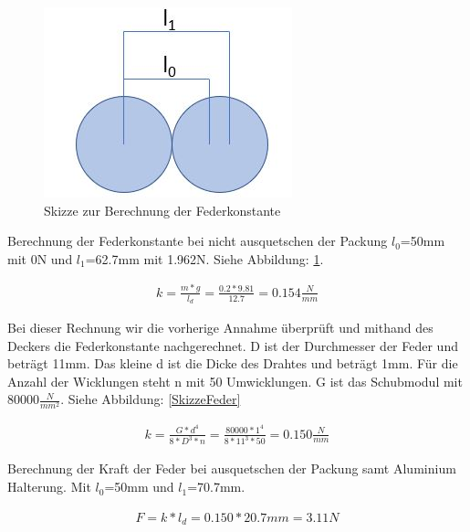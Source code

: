 \begin{figure}[H]
\begin{minipage}[hbt]{.4\linewidth}
      \includegraphics[width=\linewidth]{Bilder/Powerpoint/Federkonstante}
      \caption{Skizze zur Berechnung der Federkonstante}
      \label{SkizzeFederkonstante}
   \end{minipage}
\end{figure}

Berechnung der Federkonstante bei nicht ausquetschen der Packung $l_0$=50mm mit 0N und $l_1$=62.7mm mit 1.962N. Siehe Abbildung: \ref{SkizzeFederkonstante}.

\begin{align*}
k =\frac{m*g}{l_d} = \frac{0.2*9.81}{12.7} = 0.154\frac{N}{mm}
\end{align*}

Bei dieser Rechnung wir die vorherige Annahme überprüft und mithand des Deckers die Federkonstante nachgerechnet. D ist der Durchmesser der Feder und beträgt 11mm. Das kleine d ist die Dicke des Drahtes und beträgt 1mm. Für die Anzahl der Wicklungen steht n mit 50 Umwicklungen. G ist das Schubmodul mit 80000$\frac{N}{mm^{2}}$. Siehe Abbildung: \ref{SkizzeFeder}

\begin{align*}
k=\frac{G*d^{4}}{8*D^{3}*n}=\frac{80000*1^{4}}{8*11^{3}*50} = 0.150\frac{N}{mm}
\end{align*}

Berechnung der Kraft der Feder bei ausquetschen der Packung samt Aluminium Halterung. Mit $l_0$=50mm und $l_1$=70.7mm.

\begin{align*}
F=k*l_d=0.150*20.7mm = 3.11N
\end{align*}

